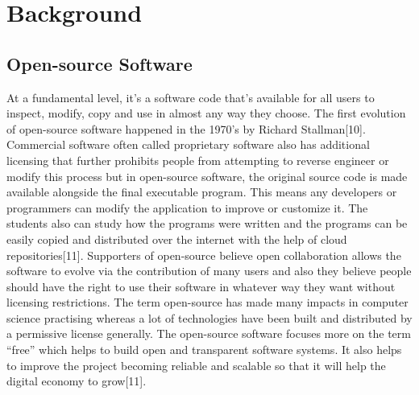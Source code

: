 %
\section{Background}\label{sec:background}
%
\subsection{Open-source Software}
At a fundamental level, it's a software code that's available for all users to inspect, modify, copy and use in almost any way they choose. The first evolution of open-source software happened in the 1970's by Richard Stallman[10]. Commercial software often called proprietary software also has additional licensing that further prohibits people from attempting to reverse engineer or modify this process but in open-source software, the original source code is made available alongside the final executable program. This means any developers or programmers can modify the application to improve or customize it. The students also can study how the programs were written and the programs can be easily copied and distributed over the internet with the help of cloud repositories[11]. Supporters of open-source believe open collaboration allows the software to evolve via the contribution of many users and also they believe people should have the right to use their software in whatever way they want without licensing restrictions. The term open-source has made many impacts in computer science practising whereas a lot of technologies have been built and distributed by a permissive license generally. The open-source software focuses more on the term “free” which helps to build open and transparent software systems. It also helps to improve the project becoming reliable and scalable so that it will help the digital economy to grow[11].
%
